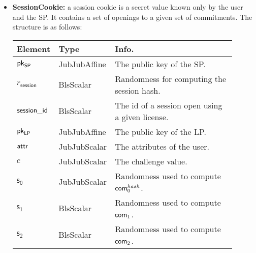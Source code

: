 \begin{itemize}
    \item \textbf{SessionCookie:} a session cookie is a secret value known only by the user and the SP. It contains a set of openings to a given set of commitments. The structure is as follows:

    \begin{center}
        \begin{tabular}{ | p{0.15\linewidth} | p{0.2\linewidth} | p{0.55\linewidth} | } 
        \hline
        \textbf{Element} & \textbf{Type} & \textbf{Info.} \\
        \hline
        $\mathsf{pk}_{\mathsf{SP}}$ & JubJubAffine & The public key of the SP. \\
        $r_\mathsf{session}$ & BlsScalar & Randomness for computing the session hash. \\
        $\mathsf{session\_id}$ & BlsScalar & The id of a session open using a given license. \\ 
        $\mathsf{pk}_{\mathsf{LP}}$ & JubJubAffine & The public key of the LP. \\ 
        $\mathsf{attr}$ & JubJubScalar & The attributes of the user. \\ 
        $c$ & JubJubScalar & The challenge value. \\ 
        $\mathsf{s_0}$ & JubJubScalar & Randomness used to compute $\mathsf{com}_0^{hash}$. \\
        $\mathsf{s_1}$ & BlsScalar & Randomness used to compute $\mathsf{com}_1$. \\
        $\mathsf{s_2}$ & BlsScalar & Randomness used to compute $\mathsf{com}_2$. \\
        \hline
        \end{tabular}
    \end{center}

\end{itemize}